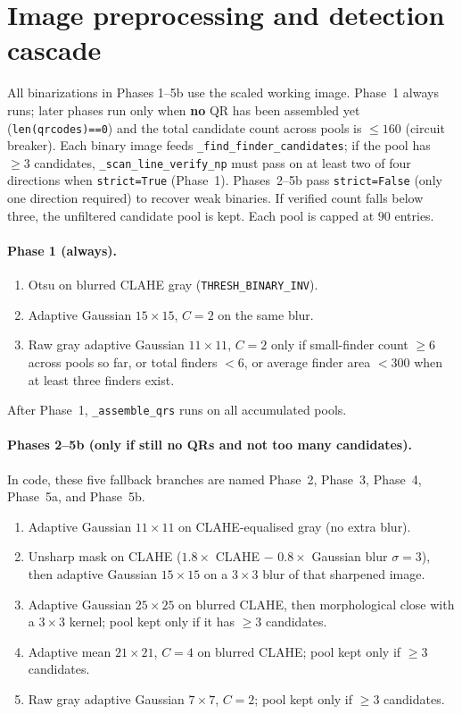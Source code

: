 \documentclass[11pt,a4paper]{article}
\begin{document}
\section{Image preprocessing and detection cascade}

All binarizations in Phases 1--5b use the scaled working image. Phase~1 always runs; later
phases run only when \textbf{no} QR has been assembled yet
(\texttt{len(qrcodes)==0}) and the total candidate count across pools is
$\le 160$ (circuit breaker). Each binary image feeds
\texttt{\_find\_finder\_candidates}; if the pool has $\ge 3$ candidates,
\texttt{\_scan\_line\_verify\_np} must pass on at least two of four directions
when \texttt{strict=True} (Phase~1). Phases~2--5b pass
\texttt{strict=False} (only one direction required) to recover weak
binaries. If verified count falls below three, the unfiltered candidate pool
is kept. Each pool is capped at $90$ entries.

\paragraph{Phase 1 (always).}
\begin{enumerate}[label=(\alph*), leftmargin=1.6em, itemsep=0.15em]
  \item Otsu on blurred CLAHE gray (\texttt{THRESH\_BINARY\_INV}).
  \item Adaptive Gaussian $15\times15$, $C=2$ on the same blur.
  \item Raw gray adaptive Gaussian $11\times11$, $C=2$ only if
        small-finder count $\ge 6$ across pools so far, or total finders
        $<6$, or average finder area $<300$ when at least three finders
        exist.
\end{enumerate}
After Phase~1, \texttt{\_assemble\_qrs} runs on all accumulated pools.

\paragraph{Phases 2--5b (only if still no QRs and not too many candidates).}


In code, these five fallback branches are named Phase~2, Phase~3, Phase~4,
Phase~5a, and Phase~5b.


\begin{enumerate}[label=(\alph*), leftmargin=1.6em, itemsep=0.15em]
  \item Adaptive Gaussian $11\times11$ on CLAHE-equalised gray (no extra blur).
  \item Unsharp mask on CLAHE ($1.8\times$ CLAHE $-$ $0.8\times$ Gaussian blur
        $\sigma=3$), then adaptive Gaussian $15\times15$ on a $3\times3$ blur
        of that sharpened image.
  \item Adaptive Gaussian $25\times25$ on blurred CLAHE, then morphological
        close with a $3\times3$ kernel; pool kept only if it has $\ge 3$
        candidates.
  \item Adaptive mean $21\times21$, $C=4$ on blurred CLAHE; pool kept only if
        $\ge 3$ candidates.
  \item Raw gray adaptive Gaussian $7\times7$, $C=2$; pool kept only if
        $\ge 3$ candidates.
\end{enumerate}
\end{document}
